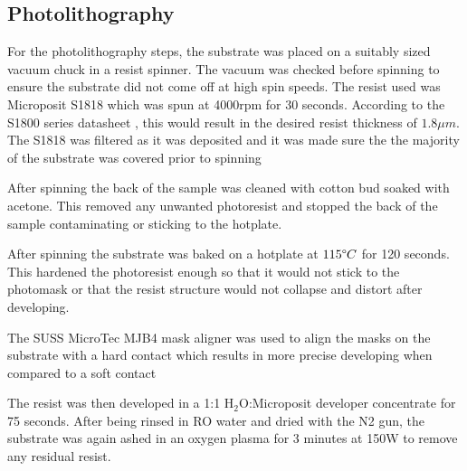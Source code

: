 \subsection{Photolithography}
\label{sec:fab:photolithography}


For the photolithography steps, the substrate was placed on a suitably sized vacuum chuck in a resist spinner. The vacuum was checked before spinning to ensure the substrate did not come off at high spin speeds. The resist used was Microposit S1818 which was spun at 4000rpm for 30 seconds. According to the S1800 series datasheet \cite{s18}, this would result in the desired resist thickness of $1.8\mu m$. The S1818 was filtered as it was deposited and it was made sure the the majority of the substrate was covered prior to spinning

After spinning the back of the sample was cleaned with cotton bud soaked with acetone. This removed any unwanted photoresist and stopped the back of the sample contaminating or sticking to the hotplate.

After spinning the substrate was baked on a hotplate at $115\degree C$ for 120 seconds. This hardened the photoresist enough so that it would not stick to the photomask or that the resist structure would not collapse and distort after developing.

The SUSS MicroTec MJB4 mask aligner was used to align the masks on the substrate with a hard contact which results in more precise developing when compared to a soft contact%

The resist was then developed in a 1:1 H$_2$O:Microposit developer concentrate for 75 seconds. After being rinsed in RO water and dried with the N2 gun, the substrate was again ashed in an oxygen plasma for 3 minutes at 150W to remove any residual resist.
